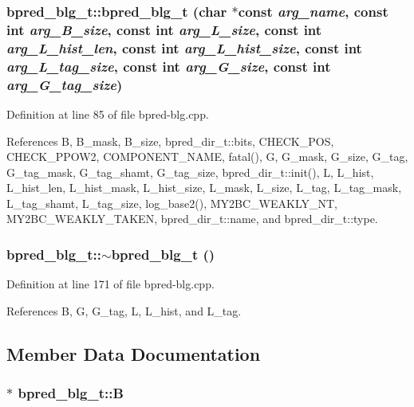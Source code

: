 \subsubsection[{bpred\_\-blg\_\-t}]{\setlength{\rightskip}{0pt plus 5cm}bpred\_\-blg\_\-t::bpred\_\-blg\_\-t (char $\ast$const  {\em arg\_\-name}, \/  const int {\em arg\_\-B\_\-size}, \/  const int {\em arg\_\-L\_\-size}, \/  const int {\em arg\_\-L\_\-hist\_\-len}, \/  const int {\em arg\_\-L\_\-hist\_\-size}, \/  const int {\em arg\_\-L\_\-tag\_\-size}, \/  const int {\em arg\_\-G\_\-size}, \/  const int {\em arg\_\-G\_\-tag\_\-size})\hspace{0.3cm}{\tt  [inline]}}\label{classbpred__blg__t_c9ede09ec4f81c76e8950b19b3c4b488}




Definition at line 85 of file bpred-blg.cpp.

References B, B\_\-mask, B\_\-size, bpred\_\-dir\_\-t::bits, CHECK\_\-POS, CHECK\_\-PPOW2, COMPONENT\_\-NAME, fatal(), G, G\_\-mask, G\_\-size, G\_\-tag, G\_\-tag\_\-mask, G\_\-tag\_\-shamt, G\_\-tag\_\-size, bpred\_\-dir\_\-t::init(), L, L\_\-hist, L\_\-hist\_\-len, L\_\-hist\_\-mask, L\_\-hist\_\-size, L\_\-mask, L\_\-size, L\_\-tag, L\_\-tag\_\-mask, L\_\-tag\_\-shamt, L\_\-tag\_\-size, log\_\-base2(), MY2BC\_\-WEAKLY\_\-NT, MY2BC\_\-WEAKLY\_\-TAKEN, bpred\_\-dir\_\-t::name, and bpred\_\-dir\_\-t::type.
\subsubsection[{$\sim$bpred\_\-blg\_\-t}]{\setlength{\rightskip}{0pt plus 5cm}bpred\_\-blg\_\-t::$\sim$bpred\_\-blg\_\-t ()\hspace{0.3cm}{\tt  [inline]}}\label{classbpred__blg__t_e3e4322668450a88f8d4c4e37627f14e}




Definition at line 171 of file bpred-blg.cpp.

References B, G, G\_\-tag, L, L\_\-hist, and L\_\-tag.

\subsection{Member Data Documentation}
\subsubsection[{B}]{$\ast$ {\bf bpred\_\-blg\_\-t::B}\hspace{0.3cm}{\tt  [protected]}}\label{classbpred__blg__t_254b5a151db3fc5c83681a58735e588b}




